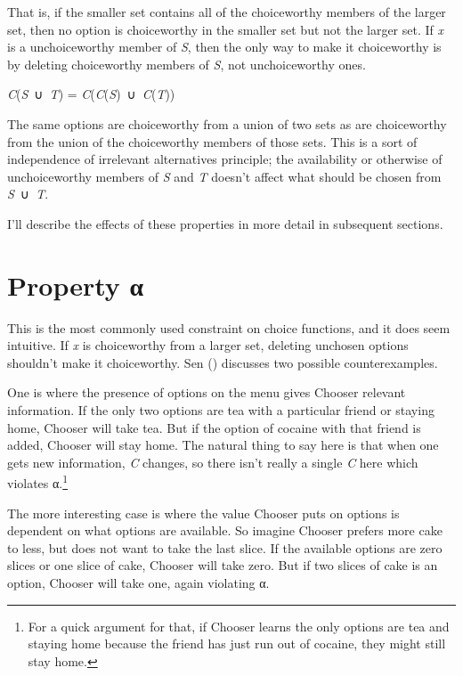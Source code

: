 \documentclass[
  11pt,
  letterpaper,
  DIV=11,
  numbers=noendperiod,
  twoside]{scrartcl}
\providecommand{\tightlist}{%
  \setlength{\itemsep}{0pt}\setlength{\parskip}{0pt}}
\begin{document}
That is, if the smaller set contains all of the choiceworthy members of
the larger set, then no option is choiceworthy in the smaller set but
not the larger set. If \emph{x} is a unchoiceworthy member of \emph{S},
then the only way to make it choiceworthy is by deleting choiceworthy
members of \emph{S}, not unchoiceworthy ones.

\begin{description}
\tightlist
\item[Path Independence]
\emph{C}(\emph{S}~∪~\emph{T}) =
\emph{C}(\emph{C}(\emph{S})~∪~\emph{C}(\emph{T}))
\end{description}

The same options are choiceworthy from a union of two sets as are
choiceworthy from the union of the choiceworthy members of those sets.
This is a sort of independence of irrelevant alternatives principle; the
availability or otherwise of unchoiceworthy members of \emph{S} and
\emph{T} doesn't affect what should be chosen from \emph{S}~∪~\emph{T}.

I'll describe the effects of these properties in more detail in
subsequent sections.

\section{Property α}\label{sec-alpha}

This is the most commonly used constraint on choice functions, and it
does seem intuitive. If \emph{x} is choiceworthy from a larger set,
deleting unchosen options shouldn't make it choiceworthy. Sen
() discusses two
possible counterexamples.

One is where the presence of options on the menu gives Chooser relevant
information. If the only two options are tea with a particular friend or
staying home, Chooser will take tea. But if the option of cocaine with
that friend is added, Chooser will stay home. The natural thing to say
here is that when one gets new information, \emph{C} changes, so there
isn't really a single \emph{C} here which violates α.\footnote{For a
  quick argument for that, if Chooser learns the only options are tea
  and staying home because the friend has just run out of cocaine, they
  might still stay home.}

The more interesting case is where the value Chooser puts on options is
dependent on what options are available. So imagine Chooser prefers more
cake to less, but does not want to take the last slice. If the available
options are zero slices or one slice of cake, Chooser will take zero.
But if two slices of cake is an option, Chooser will take one, again
violating α.
\end{document}
